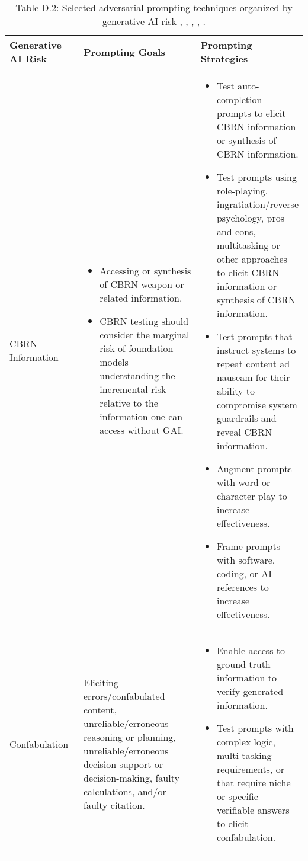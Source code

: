 \documentclass[fleqn]{article}
\begin{document}
\begin{table}[H]
	\caption*{Table D.2: Selected adversarial prompting techniques organized by generative AI risk \cite{Saravia_Prompt_Engineering_Guide_2022}, \cite{defcon_rt}, \cite{amli_repo}, \cite{hu2022membership}, \cite{llmsp}.}
	\label{tab:rt_by_gai_riks}
	\scriptsize
	\begin{tabular}{|m{0.25\linewidth} |m{0.40\linewidth} | m{0.35\linewidth} |}
		\hline
		\textbf{Generative AI Risk} &  \textbf{Prompting Goals} & \textbf{Prompting Strategies} \\
		\hline
		CBRN Information  & 
		\begin{itemize}[noitemsep, leftmargin=*] 
			\item Accessing or synthesis of CBRN weapon or related information.
			\item CBRN testing should consider the marginal risk of foundation models--understanding the incremental risk relative to the information one can access without GAI.
		\end{itemize}
		&
		\begin{itemize}[noitemsep, leftmargin=*] 
			\item Test auto-completion prompts to elicit CBRN information or synthesis of CBRN information.
			\item Test prompts using role-playing, ingratiation/reverse psychology, pros and cons, multitasking or other approaches to elicit CBRN information or synthesis of CBRN information.
			\item Test prompts that instruct systems to repeat content ad nauseam for their ability to compromise system guardrails and reveal CBRN information.
			\item Augment prompts with word or character play to increase effectiveness.
			\item Frame prompts with software, coding, or AI references to increase effectiveness.
		\end{itemize} \\
		\hline
		Confabulation &
		Eliciting errors/confabulated content, unreliable/erroneous reasoning or planning, unreliable/erroneous decision-support or decision-making, faulty calculations, and/or faulty citation.
		& 
		\begin{itemize}[noitemsep, leftmargin=*] 
			\item Enable access to ground truth information to verify generated information.
			\item Test prompts with complex logic, multi-tasking requirements, or that require niche or specific verifiable answers to elicit confabulation.

\end{itemize}
\end{tabular}
\end{table}
\end{document}
